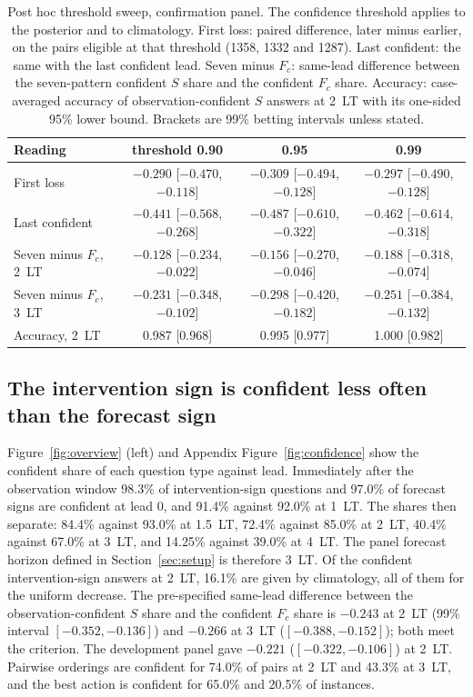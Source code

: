 \documentclass[11pt]{article}
\begin{document}
\begin{table}[t]
\centering
\small
\caption{Post hoc threshold sweep, confirmation panel. The confidence threshold applies to the posterior and to climatology. First loss: paired difference, later minus earlier, on the pairs eligible at that threshold (1358, 1332 and 1287). Last confident: the same with the last confident lead. Seven minus $F_c$: same-lead difference between the seven-pattern confident $S$ share and the confident $F_c$ share. Accuracy: case-averaged accuracy of observation-confident $S$ answers at 2~LT with its one-sided 95\% lower bound. Brackets are 99\% betting intervals unless stated.}
\label{tab:sweep}
\begin{tabular}{lccc}
\toprule
Reading & threshold 0.90 & 0.95 & 0.99 \\
\midrule
First loss & $-0.290$ [$-0.470$, $-0.118$] & $-0.309$ [$-0.494$, $-0.128$] & $-0.297$ [$-0.490$, $-0.128$] \\
Last confident & $-0.441$ [$-0.568$, $-0.268$] & $-0.487$ [$-0.610$, $-0.322$] & $-0.462$ [$-0.614$, $-0.318$] \\
Seven minus $F_c$, 2~LT & $-0.128$ [$-0.234$, $-0.022$] & $-0.156$ [$-0.270$, $-0.046$] & $-0.188$ [$-0.318$, $-0.074$] \\
Seven minus $F_c$, 3~LT & $-0.231$ [$-0.348$, $-0.102$] & $-0.298$ [$-0.420$, $-0.182$] & $-0.251$ [$-0.384$, $-0.132$] \\
Accuracy, 2~LT & 0.987 [0.968] & 0.995 [0.977] & 1.000 [0.982] \\
\bottomrule
\end{tabular}
\end{table}

\subsection{The intervention sign is confident less often than the forecast sign}
\label{sec:samelead}
Figure~\ref{fig:overview} (left) and Appendix Figure~\ref{fig:confidence} show the confident share of each question type against lead. Immediately after the observation window 98.3\% of intervention-sign questions and 97.0\% of forecast signs are confident at lead 0, and 91.4\% against 92.0\% at 1~LT. The shares then separate: 84.4\% against 93.0\% at 1.5~LT, 72.4\% against 85.0\% at 2~LT, 40.4\% against 67.0\% at 3~LT, and 14.25\% against 39.0\% at 4~LT. The panel forecast horizon defined in Section~\ref{sec:setup} is therefore 3~LT. Of the confident intervention-sign answers at 2~LT, 16.1\% are given by climatology, all of them for the uniform decrease. The pre-specified same-lead difference between the observation-confident $S$ share and the confident $F_c$ share is $-0.243$ at 2~LT (99\% interval $[-0.352, -0.136]$) and $-0.266$ at 3~LT ($[-0.388, -0.152]$); both meet the criterion. The development panel gave $-0.221$ ($[-0.322, -0.106]$) at 2~LT. Pairwise orderings are confident for 74.0\% of pairs at 2~LT and 43.3\% at 3~LT, and the best action is confident for 65.0\% and 20.5\% of instances.
\end{document}
